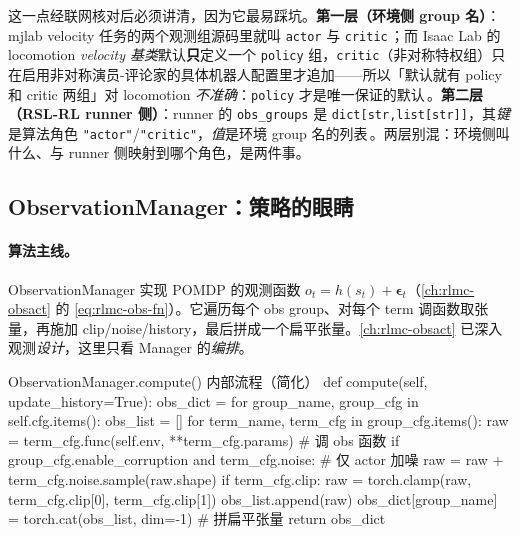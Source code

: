 \begin{insight}\label{ins:rlmc-mgr-asym}
这一点经联网核对后必须讲清，因为它最易踩坑。\textbf{第一层（环境侧 group 名）}：mjlab velocity 任务的两个观测组源码里就叫 \verb|actor| 与 \verb|critic|\,\cite{mjlab2026}；而 Isaac Lab 的 locomotion \emph{velocity 基类}默认\textbf{只}定义一个 \verb|policy| 组，\verb|critic|（非对称特权组）只在启用非对称演员-评论家的具体机器人配置里才追加——所以「默认就有 policy 和 critic 两组」对 locomotion \emph{不准确}：\verb|policy| 才是唯一保证的默认\,\cite{isaaclab2024}。\textbf{第二层（RSL-RL runner 侧）}：runner 的 \verb|obs_groups| 是 \verb|dict[str,list[str]]|，其\emph{键}是算法角色 \verb|"actor"|/\verb|"critic"|，\emph{值}是环境 group 名的列表\,\cite{schwarke2025rslrl,isaaclab2024}。两层别混：环境侧叫什么、与 runner 侧映射到哪个角色，是两件事。
\end{insight}

\subsection{ObservationManager：策略的眼睛}
\label{sec:rlmc-mgr-obs}

\paragraph{算法主线。}ObservationManager 实现 POMDP 的观测函数 $o_t=h(s_t)+\boldsymbol\epsilon_t$（\cref{ch:rlmc-obsact} 的 \cref{eq:rlmc-obs-fn}）。它遍历每个 obs group、对每个 term 调函数取张量，再施加 clip/noise/history，最后拼成一个扁平张量。\cref{ch:rlmc-obsact} 已深入观测\emph{设计}，这里只看 Manager 的\emph{编排}。

\begin{codebox}[Python]{ObservationManager.compute() 内部流程（简化）}
def compute(self, update_history=True):
    obs_dict = {}
    for group_name, group_cfg in self.cfg.items():
        obs_list = []
        for term_name, term_cfg in group_cfg.items():
            raw = term_cfg.func(self.env, **term_cfg.params)        # 调 obs 函数
            if group_cfg.enable_corruption and term_cfg.noise:     # 仅 actor 加噪
                raw = raw + term_cfg.noise.sample(raw.shape)
            if term_cfg.clip:
                raw = torch.clamp(raw, term_cfg.clip[0], term_cfg.clip[1])
            obs_list.append(raw)
        obs_dict[group_name] = torch.cat(obs_list, dim=-1)         # 拼扁平张量
    return obs_dict
\end{codebox}

